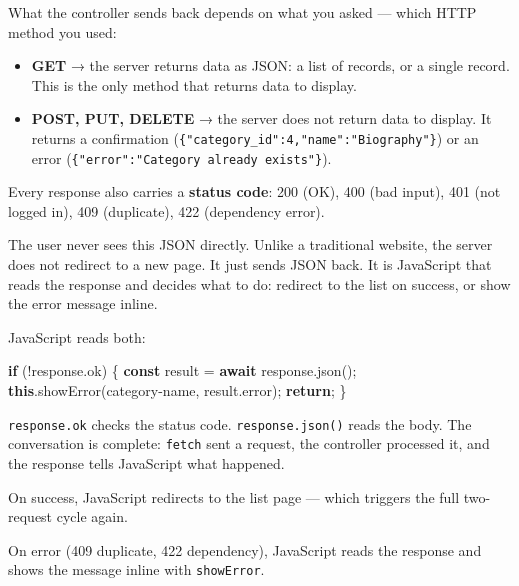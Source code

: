 \documentclass[11pt,a4paper,oneside]{book}
\newenvironment{Shaded}{\begin{snugshade}}{\end{snugshade}}
\newcommand{\KeywordTok}[1]{\textcolor[HTML]{007020}{\textbf{#1}}}
\newcommand{\StringTok}[1]{\textcolor[HTML]{4070A0}{#1}}
\newcommand{\FunctionTok}[1]{\textcolor[HTML]{06287E}{#1}}
\newcommand{\ControlFlowTok}[1]{\textcolor[HTML]{007020}{\textbf{#1}}}
\newcommand{\OperatorTok}[1]{\textcolor[HTML]{666666}{#1}}
\newcommand{\AttributeTok}[1]{\textcolor[HTML]{7D9029}{#1}}
\newcommand{\NormalTok}[1]{#1}
\providecommand{\tightlist}{%
  \setlength{\itemsep}{0pt}\setlength{\parskip}{0pt}}
\begin{document}
What the controller sends back depends on what you asked ---
which HTTP method you used:

\begin{itemize}
\tightlist
\item
  \textbf{GET} → the server returns data as JSON: a list of
  records, or a single record. This is the only method that
  returns data to display.
\item
  \textbf{POST, PUT, DELETE} → the server does not return data to
  display. It returns a confirmation
  (\texttt{\{"category\_id":4,"name":"Biography"\}}) or an error
  (\texttt{\{"error":"Category\ already\ exists"\}}).
\end{itemize}

Every response also carries a \textbf{status code}: 200 (OK), 400
(bad input), 401 (not logged in), 409 (duplicate), 422
(dependency error).

The user never sees this JSON directly. Unlike a traditional
website, the server does not redirect to a new page. It just
sends JSON back. It is JavaScript that reads the response and
decides what to do: redirect to the list on success, or show the
error message inline.

JavaScript reads both:

\begin{Shaded}
\begin{Highlighting}[]
\ControlFlowTok{if}\NormalTok{ (}\OperatorTok{!}\NormalTok{response}\OperatorTok{.}\AttributeTok{ok}\NormalTok{) \{}
    \KeywordTok{const}\NormalTok{ result }\OperatorTok{=} \ControlFlowTok{await}\NormalTok{ response}\OperatorTok{.}\FunctionTok{json}\NormalTok{()}\OperatorTok{;}
    \KeywordTok{this}\OperatorTok{.}\FunctionTok{showError}\NormalTok{(}\StringTok{\textquotesingle{}category{-}name\textquotesingle{}}\OperatorTok{,}\NormalTok{ result}\OperatorTok{.}\AttributeTok{error}\NormalTok{)}\OperatorTok{;}
    \ControlFlowTok{return}\OperatorTok{;}
\NormalTok{\}}
\end{Highlighting}
\end{Shaded}

\texttt{response.ok} checks the status code.
\texttt{response.json()} reads the body. The conversation is
complete: \texttt{fetch} sent a request, the controller processed
it, and the response tells JavaScript what happened.

On success, JavaScript redirects to the list page --- which
triggers the full two-request cycle again.

On error (409 duplicate, 422 dependency), JavaScript reads the
response and shows the message inline with \texttt{showError}.
\end{document}
